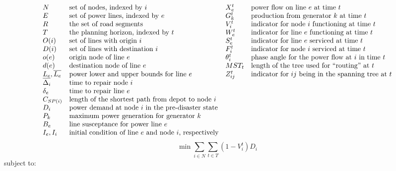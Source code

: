 \documentclass{article}
\begin{document}
	\begin{displaymath}
	\begin{array}{llll}
	N & \mbox{set of nodes, indexed by $i$} & X_{e}^{t} & \mbox{power flow on line $e$ at time $t$}\\
	E & \mbox{set of power lines, indexed by $e$} & G_{k}^t & \mbox{production from generator $k$ at time $t$}\\
	R & \mbox{the set of road segments} & V_i^t & \mbox{indicator for node $i$ functioning at time $t$}\\
	T & \mbox{the planning horizon, indexed by $t$} & W_{e}^t & \mbox{indicator for line $e$ functioning at time $t$} \\
	O(i) & \mbox{set of lines with origin $i$} & S_{e}^t & \mbox{indicator for line $e$ serviced at time $t$}\\
	D(i) & \mbox{set of lines with destination $i$} & F_i^t & \mbox{indicator for node $i$ serviced at time $t$}\\
	o(e) & \mbox{origin node of line $e$} & \theta_i^t & \mbox{phase angle for the power flow at $i$ in time $t$}\\
	d(e) & \mbox{destination node of line $e$} & MST_t & \mbox{length of the tree used for ``routing'' at $t$} \\
	\underline{L_e},\overline{L_e} & \mbox{power lower and upper bounds for line $e$}& Z_{ij}^t & \mbox{indicator for $ij$ being in the spanning tree at $t$}\\
	\Delta_{i} & \mbox{time to repair node $i$} \\
	\delta_{e} & \mbox{time to repair line $e$}\\
	C_{SP(i)} & \mbox{length of the shortest path from depot to node $i$}\\
	D_i & \mbox{power demand at node $i$ in the pre-disaster state}\\
	P_k & \mbox{maximum power generation for generator $k$}\\
	B_e&  \mbox{line susceptance for power line $e$}\\
	I_e, I_i & \mbox{initial condition of line $e$ and node $i$, respectively}
	\end{array}
	\normalsize
	\end{displaymath}
	\begin{equation}
	\min \sum_{i \in N} \sum_{t \in T} (1-V_i^t)D_i
	\end{equation}
	subject to:
\end{document}
